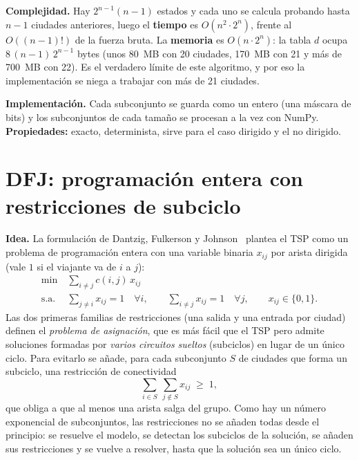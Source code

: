 \textbf{Complejidad.} Hay $2^{n-1}(n-1)$ estados y cada uno se calcula probando hasta $n-1$ ciudades anteriores, luego el \textbf{tiempo} es $O(n^2\cdot 2^n)$, frente al $O((n-1)!)$ de la fuerza bruta. La \textbf{memoria} es $O(n\cdot 2^n)$:
la tabla $d$ ocupa $8\,(n-1)\,2^{n-1}$ bytes (unos 80~MB con 20 ciudades, 170~MB con 21 y más de 700~MB con 22). Es el verdadero límite de este algoritmo, y por eso la implementación se niega a trabajar con más de 21 ciudades.

\textbf{Implementación.} Cada subconjunto se guarda como un entero (una máscara de bits) y los subconjuntos de cada tamaño se procesan a la vez con NumPy. \textbf{Propiedades:} exacto, determinista, sirve para el caso dirigido y el no dirigido.

\section{DFJ: programación entera con restricciones de subciclo}\label{sec:dfj}

\textbf{Idea.} La formulación de Dantzig, Fulkerson y Johnson~\cite{dfj1954} plantea el TSP como un problema de programación entera con una variable binaria $x_{ij}$ por arista dirigida (vale $1$ si el viajante va de $i$ a $j$):
\begin{equation}\label{eq:dfj}
\begin{aligned}
  \min\ & \sum_{i\neq j} c(i,j)\,x_{ij}\\
  \text{s.a. } & \sum_{j\neq i} x_{ij}=1\quad\forall i,\qquad \sum_{i\neq j} x_{ij}=1\quad\forall j,\qquad x_{ij}\in\{0,1\}.
\end{aligned}
\end{equation}
Las dos primeras familias de restricciones (una salida y una entrada por ciudad) definen el \emph{problema de asignación}, que es más fácil que el TSP pero admite soluciones formadas por \emph{varios circuitos sueltos} (subciclos) en lugar de un único ciclo.
Para evitarlo se añade, para cada subconjunto $S$ de ciudades que forma un subciclo, una restricción de conectividad
\begin{equation}\label{eq:subciclo}
  \sum_{i\in S}\ \sum_{j\notin S} x_{ij}\;\ge\;1,
\end{equation}
que obliga a que al menos una arista salga del grupo. Como hay un número exponencial de subconjuntos, las restricciones no se añaden todas desde el principio: se resuelve el modelo, se detectan los subciclos de la solución, se añaden sus restricciones
y se vuelve a resolver, hasta que la solución sea un único ciclo.

